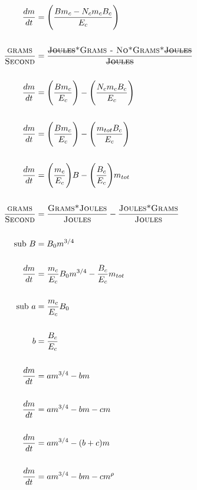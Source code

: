 \documentclass[a3paper]{article} %
\begin{document}
\begin{multicols}{2}
\begin{align*}
    \frac{dm}{dt} &= \Bigg(\frac{Bm_c - N_{c}m_{c}B_{c}}{E_c}\Bigg) \\ \\
    \frac{\textsc{grams}}{\textsc{Second}} &= \frac{\textsc{\st{Joules}*Grams - No*Grams*\st{Joules}}}{\textsc{\st{Joules}}} \\ \\
    \frac{dm}{dt} &= \Bigg(\frac{Bm_c}{E_c}\Bigg) - \Bigg(\frac{N_{c}m_{c}B_{c}}{E_c}\Bigg) \\ \\
    \frac{dm}{dt} &= \Bigg(\frac{Bm_c}{E_c}\Bigg) - \Bigg(\frac{m_{tot}B_{c}}{E_c}\Bigg) \\ \\
    \frac{dm}{dt} &= \Bigg(\frac{m_c}{E_c}\Bigg)B - \Bigg(\frac{B_{c}}{E_c}\Bigg)m_{tot} \\ \\
    \frac{\textsc{grams}}{\textsc{Second}} &= \frac{\textsc{Grams*Joules}}{\textsc{Joules}} - \frac{\textsc{Joules*Grams}}{\textsc{Joules}} \\ \\
    \text{sub } B &= B_{0}m^{3/4}  \\ \\
    \frac{dm}{dt} &= \frac{m_c}{E_c}B_{0}m^{3/4} - \frac{B_{c}}{E_c}m_{tot} \\ \\
    \text{sub } a &= \frac{m_c}{E_c}B_{0}  \\ \\
    b &= \frac{B_{c}}{E_c} \\ \\
    \frac{dm}{dt} &= am^{3/4} - bm \\ \\
    \frac{dm}{dt} &= am^{3/4} - bm - cm \\ \\
    \frac{dm}{dt} &= am^{3/4} - (b+c)m \\ \\
    \frac{dm}{dt} &= am^{3/4} - bm - cm^{\rho} \\ \\
\end{align*}


\end{multicols}
\end{document}
